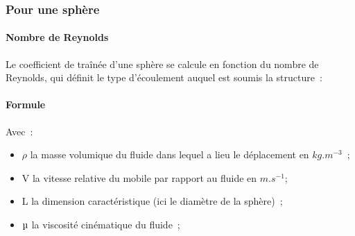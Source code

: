 \documentclass[a4paper,11pt]{article}
\begin{document}
\subsubsection{Pour une sphère}
\paragraph{Nombre de Reynolds}
	Le coefficient de traînée d'une sphère se calcule en fonction du nombre de Reynolds, qui définit le type d'écoulement auquel est soumis la structure~:


\paragraph{Formule}
	\begin{center}
  \end{center}
	Avec~:
  \begin{itemize}
	 \item $\rho$ la masse volumique du fluide dans lequel a lieu le déplacement en $kg.m^{-3}$~;
   \item V la vitesse relative du mobile par rapport au fluide en $m.s^{-1}$;
   \item L la dimension caractéristique (ici le diamètre de la sphère)~;
   \item $\micro$ la viscosité cinématique du fluide~;
  \end{itemize}
\end{document}
